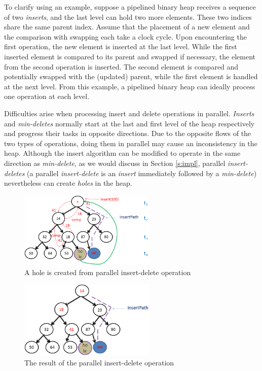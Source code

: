 To clarify using an example, suppose a pipelined binary heap receives a sequence of two {\it inserts}, and the last level can hold two more elements.
These two indices share the same parent index.
Assume that the placement of a new element and the comparison with swapping each take a clock cycle.
Upon encountering the first operation, the new element is inserted at the last level.
While the first inserted element is compared to its parent and swapped if necessary, the element from the second operation is inserted.
The second element is compared and potentially swapped with the (updated) parent, while the first element is handled at the next level.
From this example, a pipelined binary heap can ideally process one operation at each level.

Difficulties arise when processing insert and delete operations in parallel.
{\it Inserts} and {\it min-deletes} normally start at the last and first level of the heap respectively and progress their tasks in opposite directions.
Due to the opposite flows of the two types of operations, doing them in parallel may cause an inconsistency in the heap.
Although the insert algorithm can be modified to operate in the same direction as {\it min-delete}, as we would discuss in Section \autoref{s:impl}, parallel {\it insert-deletes} (a parallel {\it insert-delete} is an {\it insert} immediately followed by a {\it min-delete}) nevertheless can create {\it holes} in the heap. 

\begin{figure}[!ht]
  \centering
  \includegraphics[width=6.5cm]{fig/normal-insert-delete.png}
      \caption{A hole is created from parallel insert-delete operation}
    \label{hole}
\end{figure}

\begin{figure}[!ht]
  \centering
  \includegraphics[width=6.5cm]{fig/normal-insert-delete-2.png}
      \caption{The result of the parallel insert-delete operation}
    \label{hole-after}
\end{figure}

